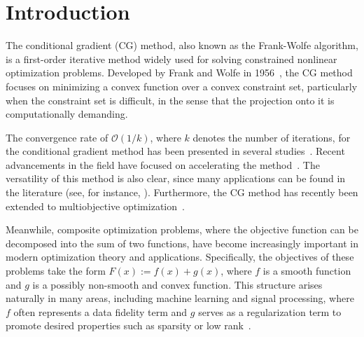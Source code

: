 \documentclass[pdflatex,sn-mathphys-num]{sn-jnl}%
\theoremstyle{definition} %
\theoremstyle{remark} %
\begin{document}



\maketitle

\section{Introduction}

The conditional gradient (CG) method, also known as the Frank-Wolfe algorithm, is a first-order iterative method widely used for solving constrained nonlinear optimization problems. Developed by Frank and Wolfe in 1956~\cite{frank1956algorithm}, the CG method focuses on minimizing a convex function over a convex constraint set, particularly when the constraint set is difficult, in the sense that the projection onto it is computationally demanding.

The convergence rate of  $\mathcal{O}(1/k)$, where $k$ denotes the number of iterations, for the conditional gradient method has been presented in several studies~\cite{bach2015duality, pmlr-v28-jaggi13}. Recent advancements in the field have focused on accelerating the method~\cite{li2021momentum, zhang2021accelerating}. The versatility of this method is also clear, since many applications can be found in the literature (see, for instance, \cite{lacoste2013block, dalmasso2023efficient}). Furthermore, the CG method has recently been extended to multiobjective optimization~\cite{assunccao2021conditional,assunccao2023generalized,GF24}.


Meanwhile, composite optimization problems, where the objective function can be decomposed into the sum of two functions, have become increasingly important in modern optimization theory and applications. Specifically, the objectives of these problems take the form \( F(x) := f(x) + g(x) \), where \( f \) is a smooth function and \( g \) is a possibly non-smooth and convex function. This structure arises naturally in many areas, including machine learning and signal processing, where \( f \) often represents a data fidelity term and \( g \) serves as a regularization term to promote desired properties such as sparsity or low rank~\cite{wright2009sparse, tibshirani1996regression, combettes2005signal}. 
\end{document}
